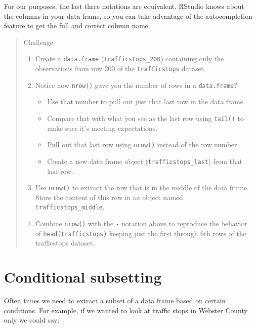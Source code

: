 \documentclass[
]{book}
\providecommand{\tightlist}{%
  \setlength{\itemsep}{0pt}\setlength{\parskip}{0pt}}
\begin{document}
For our purposes, the last three notations are equivalent. RStudio knows about
the columns in your data frame, so you can take advantage of the autocompletion
feature to get the full and correct column name.

\begin{quote}
Challenge

\begin{enumerate}
\def\labelenumi{\arabic{enumi}.}
\item
  Create a \texttt{data.frame} (\texttt{trafficstops\_200}) containing only the observations from
  row 200 of the \texttt{trafficstops} dataset.
\item
  Notice how \texttt{nrow()} gave you the number of rows in a \texttt{data.frame}?

  \begin{itemize}
  \tightlist
  \item
    Use that number to pull out just that last row in the data frame.
  \item
    Compare that with what you see as the last row using \texttt{tail()} to make
    sure it's meeting expectations.
  \item
    Pull out that last row using \texttt{nrow()} instead of the row number.
  \item
    Create a new data frame object (\texttt{trafficstops\_last}) from that last row.
  \end{itemize}
\item
  Use \texttt{nrow()} to extract the row that is in the middle of the data
  frame. Store the content of this row in an object named \texttt{trafficstops\_middle}.
\item
  Combine \texttt{nrow()} with the \texttt{-} notation above to reproduce the behavior of
  \texttt{head(trafficstops)} keeping just the first through 6th rows of the trafficstops
  dataset.
\end{enumerate}
\end{quote}

\hypertarget{conditional-subsetting-1}{%
\section{Conditional subsetting}\label{conditional-subsetting-1}}

Often times we need to extract a subset of a data frame based on certain conditions. For example, if we wanted to look at traffic stops in Webster County only we could say:
\end{document}

